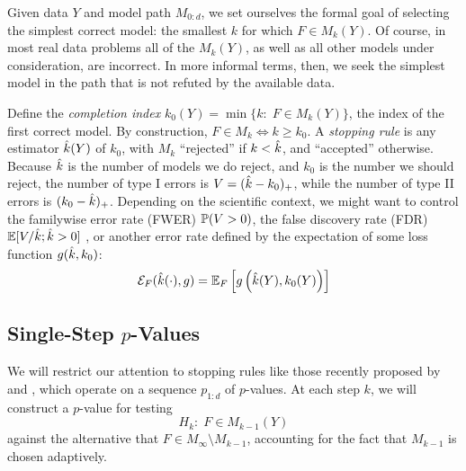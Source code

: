 \documentclass{article}
\begin{document}
Given data $Y$ and model path $M_{0:d}$, we set ourselves the formal goal of selecting the simplest correct model: the smallest $k$ for which $F\in M_k(Y)$. Of course, in most real data problems all of the $M_k(Y)$, as well as all other models under consideration, are incorrect. In more informal terms, then, we seek the simplest model in the path that is not refuted by the available data.


Define the {\em completion index} $k_0(Y) = \min\{k:\; F \in M_k(Y)\}$, the index of the first correct model. By construction, $F\in M_k \iff k \geq k_0$. A {\em stopping rule} is any estimator $\hk(Y)$ of $k_0$, with $M_k$ ``rejected'' if $k < \hk$, and ``accepted'' otherwise. Because $\hk$ is the number of models we do reject, and $k_0$ is the number we should reject, the number of type I errors is $V=(\hk-k_0)_+$, while the number of type II errors is $(k_0-\hk)_+$. Depending on the scientific context, we might want to control the familywise error rate (FWER) $\P(V>0)$, the false discovery rate (FDR) $\E[V/\hk; \hk>0]$ \citep{benjamini1995controlling}, or another error rate defined by the expectation of some loss function $g(\hk, k_0)$:
\begin{equation}\label{eq:errRate}
\Err_F(\hk(\cdot), g) = \E_F\left[ g\left(\hk(Y), k_0(Y)\right)\right]
\end{equation}

\subsection{Single-Step $p$-Values}\label{sec:singleStep}

We will restrict our attention to stopping rules like those recently proposed by \citet{gsell2013sequential} and \citet{li2015accumulation}, which operate on a sequence $p_{1:d}$ of $p$-values. At each step $k$, we will construct a $p$-value for testing
\[
H_{k}:\; F\in M_{k-1}(Y)
\]
against the alternative that $F\in M_\infty\setminus M_{k-1}$, accounting for the fact that $M_{k-1}$ is chosen adaptively.
\end{document}
